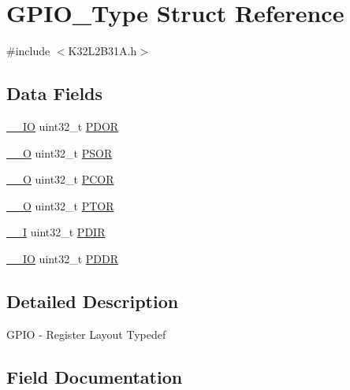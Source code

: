 \hypertarget{struct_g_p_i_o___type}{}\section{G\+P\+I\+O\+\_\+\+Type Struct Reference}
\label{struct_g_p_i_o___type}


{\ttfamily \#include $<$K32\+L2\+B31\+A.\+h$>$}

\subsection*{Data Fields}
\begin{DoxyCompactItemize}
\item 
\mbox{\hyperlink{core__cm0plus_8h_aec43007d9998a0a0e01faede4133d6be}{\+\_\+\+\_\+\+IO}} uint32\+\_\+t \mbox{\hyperlink{struct_g_p_i_o___type_aef77a53fb6962f329978c788b3c1e637}{P\+D\+OR}}
\item 
\mbox{\hyperlink{core__cm0plus_8h_a7e25d9380f9ef903923964322e71f2f6}{\+\_\+\+\_\+O}} uint32\+\_\+t \mbox{\hyperlink{struct_g_p_i_o___type_a3aa2323e3b596f8c9f191acb2ad7f75d}{P\+S\+OR}}
\item 
\mbox{\hyperlink{core__cm0plus_8h_a7e25d9380f9ef903923964322e71f2f6}{\+\_\+\+\_\+O}} uint32\+\_\+t \mbox{\hyperlink{struct_g_p_i_o___type_ac53cb29f8a090565bec5e94b6b808572}{P\+C\+OR}}
\item 
\mbox{\hyperlink{core__cm0plus_8h_a7e25d9380f9ef903923964322e71f2f6}{\+\_\+\+\_\+O}} uint32\+\_\+t \mbox{\hyperlink{struct_g_p_i_o___type_a1c26bce9144a9606d3f8a60dc750b063}{P\+T\+OR}}
\item 
\mbox{\hyperlink{core__cm0plus_8h_af63697ed9952cc71e1225efe205f6cd3}{\+\_\+\+\_\+I}} uint32\+\_\+t \mbox{\hyperlink{struct_g_p_i_o___type_a1013b95ac09a1205ba0528ad32ad1edc}{P\+D\+IR}}
\item 
\mbox{\hyperlink{core__cm0plus_8h_aec43007d9998a0a0e01faede4133d6be}{\+\_\+\+\_\+\+IO}} uint32\+\_\+t \mbox{\hyperlink{struct_g_p_i_o___type_a441a96d3febd01d841b24561b4d036a3}{P\+D\+DR}}
\end{DoxyCompactItemize}


\subsection{Detailed Description}
G\+P\+IO -\/ Register Layout Typedef 

\subsection{Field Documentation}
\mbox{\label{struct_g_p_i_o___type_ac53cb29f8a090565bec5e94b6b808572}} 
